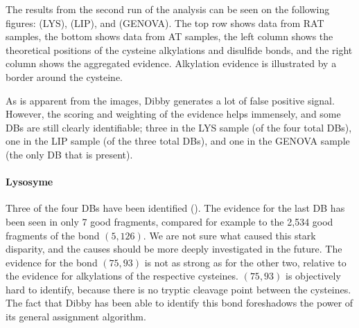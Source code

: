 The results from the second run of the analysis can be seen on the following figures:  (LYS),  (LIP), and  (GENOVA). The top row shows data from RAT samples, the bottom shows data from AT samples, the left column shows the theoretical positions of the cysteine alkylations and disulfide bonds, and the right column shows the aggregated evidence. Alkylation evidence is illustrated by a border around the cysteine.

As is apparent from the images, Dibby generates a lot of false positive signal. However, the scoring and weighting of the evidence helps immensely, and some DBs are still clearly identifiable; three in the LYS sample (of the four total DBs), one in the LIP sample (of the three total DBs), and one in the GENOVA sample (the only DB that is present).


\paragraph{Lysosyme} Three of the four DBs have been identified (). The evidence for the last DB has been seen in only 7 good fragments, compared for example to the 2,534 good fragments of the bond \((5, 126)\). We are not sure what caused this stark disparity, and the causes should be more deeply investigated in the future. The evidence for the bond \((75, 93)\) is not as strong as for the other two, relative to the evidence for alkylations of the respective cysteines. \((75, 93)\) is objectively hard to identify, because there is no tryptic cleavage point between the cysteines. The fact that Dibby has been able to identify this bond foreshadows the power of its general assignment algorithm.

